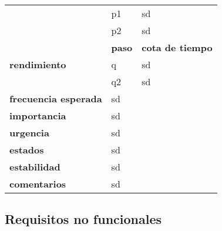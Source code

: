 \begin{table}[H]
\begin{tabular}{|l|l|l|}
		& p1            & sd                      \\ \cline{2-3} 
		& p2            & sd                      \\ \hline
		\multirow{3}{*}{\textbf{rendimiento}}      & \textbf{paso} & \textbf{cota de tiempo} \\ \cline{2-3} 
		& q             & sd                      \\ \cline{2-3} 
		& q2            & sd                      \\ \hline
		\textbf{frecuencia esperada}               & \multicolumn{2}{l|}{sd}                 \\ \hline
		\textbf{importancia}                       & \multicolumn{2}{l|}{sd}                 \\ \hline
		\textbf{urgencia}                          & \multicolumn{2}{l|}{sd}                 \\ \hline
		\textbf{estados}                           & \multicolumn{2}{l|}{sd}                 \\ \hline
		\textbf{estabilidad}                       & \multicolumn{2}{l|}{sd}                 \\ \hline
		\textbf{comentarios}                       & \multicolumn{2}{l|}{sd}                 \\ \hline
	\end{tabular}
\end{table}

\subsection{Requisitos no funcionales}